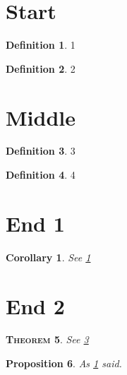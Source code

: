 \documentclass{article}
\newtheorem{thm}{\textsc{Theorem}}[subsection]
\newtheorem{prop}[thm]{Proposition}
\newtheorem{cor}{Corollary}[thm]
\theoremstyle{definition}
\newtheorem{defn}[thm]{Definition}
\begin{document}
\section{Start}

\begin{defn}
	\label{def:1}
	1
\end{defn}

\begin{defn}
	\label{def:2}
	2
\end{defn}

\section{Middle}

\begin{defn}
	\label{def:3}
	3
\end{defn}

\begin{defn}
	\label{def:4}
	4
\end{defn}

\section{End 1}

\begin{cor}
	\label{cor:back1}
	See \ref{def:1}
\end{cor}

\section{End 2}

\begin{thm}
	\label{cor:back3}
	See \ref{def:3}
\end{thm}
\begin{prop}
	\label{prop:backcor}
	As \ref{cor:back1} said.
\end{prop}
\end{document}
